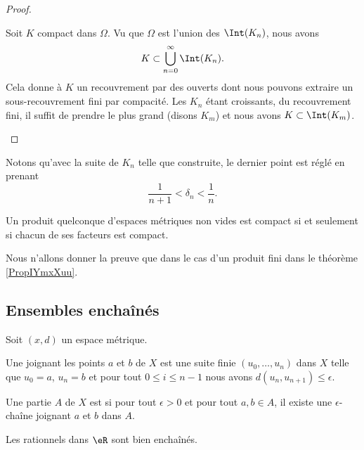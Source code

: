 \begin{proof}
\begin{enumerate}
            Soit \( K\) compact dans \( \Omega\). Vu que \( \Omega\) est l'union des \( \Int(K_n)\), nous avons
            \begin{equation}
                K\subset\bigcup_{n=0}^{\infty}\Int(K_n).
            \end{equation}
            Cela donne à \( K\) un recouvrement par des ouverts dont nous pouvons extraire un sous-recouvrement fini par compacité. Les \( K_n\) étant croissants, du recouvrement fini, il suffit de prendre le plus grand (disons \( K_m\)) et nous avons \( K\subset\Int(K_m)\).

    \end{enumerate}
\end{proof}
Notons qu'avec la suite de \( K_n\) telle que construite, le dernier point est réglé en prenant
\begin{equation}
    \frac{1}{ n+1 }<\delta_n<\frac{1}{ n }.
\end{equation}


\begin{theorem}[Tykhonov]\label{ThoFWXsQOZ}
    Un produit quelconque d'espaces métriques non vides est compact si et seulement si chacun de ses facteurs est compact.
\end{theorem}
Nous n'allons donner la preuve que dans le cas d'un produit fini dans le théorème \ref{PropIYmxXuu}.
\subsection{Ensembles enchaînés}

Soit \( (x,d)\) un espace métrique.
\begin{definition}
    Une  joignant les points \( a\) et \( b\) de \( X\) est une suite finie \( (u_0,\ldots, u_n)\) dans \( X\) telle que \( u_0=a\), \( u_n=b\) et pour tout \( 0\leq i\leq n-1\) nous avons \( d(u_n,u_{n+1})\leq \epsilon\).

    Une partie \( A\) de \( X\) est  si pour tout \( \epsilon>0\) et pour tout \( a,b\in A\), il existe une \( \epsilon\)-chaîne joignant \( a\) et \( b\) dans $A$.
\end{definition}
Les rationnels dans \( \eR\) sont bien enchaînés.

